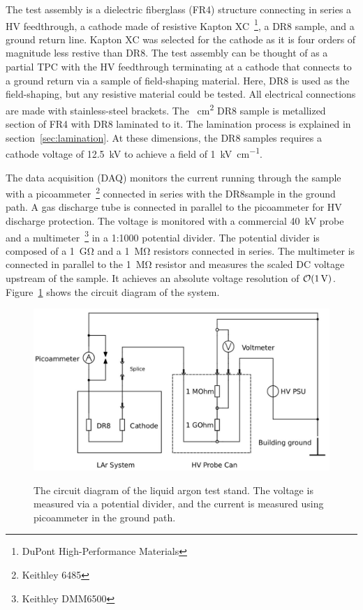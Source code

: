\documentclass[a4paper,12pt]{article}
\newcommand{\DR}{DR8}
\begin{document}
The test assembly is a dielectric fiberglass (FR4) structure connecting in series a HV feedthrough, a cathode made of resistive Kapton XC~\footnote{DuPont High-Performance Materials}, a {\DR} sample, and a ground return line.
Kapton XC was selected for the cathode as it is four orders of magnitude less restive than {\DR}.  
The test assembly can be thought of as a partial TPC with the HV feedthrough terminating at a cathode that connects to a ground return via a sample of field-shaping material. 
Here, {\DR} is used as the field-shaping, but any resistive material could be tested.    
All electrical connections are made with stainless-steel brackets.    
The ~\unit{\centi\metre\squared} {\DR} sample is metallized section of FR4 with {\DR} laminated to it.
The lamination process is explained in section~\ref{sec:lamination}.
At these dimensions, the {\DR} samples requires a cathode voltage of \SI{12.5}{\kilo\volt} to achieve a field of \SI{1}{\kilo\volt\per\centi\metre}.    

The data acquisition (DAQ) monitors the current running through the sample with a picoammeter~\footnote{Keithley 6485} connected in series with the \DR sample in the ground path. 
A gas discharge tube is connected in parallel to the picoammeter for HV discharge protection. 
The voltage is monitored with a commercial \SI{40}{\kilo\volt} probe and a multimeter~\footnote{Keithley DMM6500} in a 1:1000 potential divider. 
The potential divider is composed of a \SI{1}{\giga\ohm} and a \SI{1}{\mega\ohm} resistors connected in series. 
The multimeter is connected in parallel to the \SI{1}{\mega\ohm} resistor and measures the scaled DC voltage upstream of the sample. 
It achieves an absolute voltage resolution of $\order{\SI{1}{\volt}}$.
Figure~\ref{fig:circuit} shows the circuit diagram of the system. 

\begin{figure}[ht]
	{\includegraphics[width=0.8\linewidth]{circuit.jpg}}
	\caption{The circuit diagram of the liquid argon test stand. The voltage is measured via a potential divider, and the current is measured using  picoammeter in the ground path.}
	\label{fig:circuit}
\end{figure}
\end{document}
